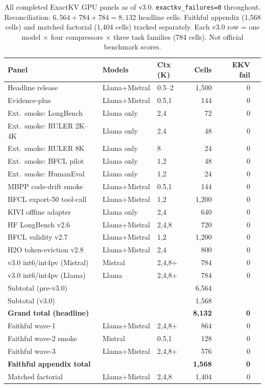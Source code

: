\documentclass[11pt]{article}
\begin{document}
\begin{table}[H]
\centering\footnotesize\setlength\tabcolsep{3pt}
\renewcommand{\arraystretch}{1.05}
\begin{tabularx}{\textwidth}{Xllrrc}
\toprule
\textbf{Panel} & \textbf{Models} & \textbf{Ctx (K)} & \textbf{Cells} & \textbf{EKV fail} \\
\midrule
Headline release & Llama+Mistral & 0.5--2 & 1,500 & 0 \\
Evidence-plus & Llama+Mistral & 0.5,1 & 144 & 0 \\
Ext.\ smoke: LongBench & Llama only & 2,4 & 72 & 0 \\
Ext.\ smoke: RULER 2K--4K & Llama only & 2,4 & 48 & 0 \\
Ext.\ smoke: RULER 8K & Llama only & 8 & 24 & 0 \\
Ext.\ smoke: BFCL pilot & Llama only & 1,2 & 48 & 0 \\
Ext.\ smoke: HumanEval & Llama only & 1,2 & 24 & 0 \\
MBPP code-drift smoke & Llama+Mistral & 0.5,1 & 144 & 0 \\
BFCL export-50 tool-call & Llama+Mistral & 1,2 & 1,200 & 0 \\
KIVI offline adapter & Llama only & 2,4 & 640 & 0 \\
HF LongBench v2.6 & Llama+Mistral & 2,4,8 & 720 & 0 \\
BFCL validity v2.7 & Llama+Mistral & 1,2 & 1,200 & 0 \\
H2O token-eviction v2.8 & Llama+Mistral & 2,4 & 800 & 0 \\
v3.0 int6/int4pv (Mistral) & Mistral & 2,4,8+ & 784 & 0 \\
v3.0 int6/int4pv (Llama) & Llama & 2,4,8+ & 784 & 0 \\
\midrule
Subtotal (pre-v3.0) & & & 6,564 & \\
Subtotal (v3.0) & & & 1,568 & \\
\textbf{Grand total (headline)} & & & \textbf{8,132} & \textbf{0} \\
\midrule
Faithful wave-1 & Llama+Mistral & 2,4,8+ & 864 & 0 \\
Faithful wave-2 smoke & Mistral & 0.5,1 & 128 & 0 \\
Faithful wave-3 & Llama+Mistral & 2,4,8+ & 576 & 0 \\
\textbf{Faithful appendix total} & & & \textbf{1,568} & \textbf{0} \\
\midrule
Matched factorial & Llama+Mistral & 2,4,8 & 1,404 & 0 \\
\bottomrule
\end{tabularx}
\caption{All completed ExactKV GPU panels as of v3.0. \texttt{exactkv\_failures=0} throughout.
Reconciliation: $6{,}564 + 784 + 784 = 8{,}132$ headline cells. Faithful appendix
(1,568 cells) and matched factorial (1,404 cells) tracked separately. Each v3.0 row =
one model $\times$ four compressors $\times$ three task families (784 cells).
Not official benchmark scores.}
\label{tab:all-panels}
\end{table}
\end{document}
